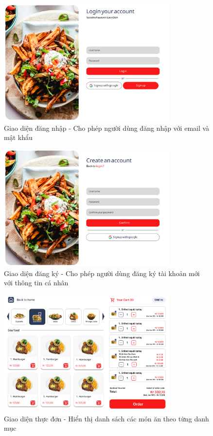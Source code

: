 \documentclass[a4paper]{article}
\begin{document}
    \begin{figure}[H]
        \centering
        \includegraphics[width=0.8\textwidth]{figmaLogin.png}
        \caption{Giao diện đăng nhập - Cho phép người dùng đăng nhập với email và mật khẩu}
    \end{figure}
    
    \begin{figure}[H]
        \centering
        \includegraphics[width=0.8\textwidth]{figmaRegister.png}
        \caption{Giao diện đăng ký - Cho phép người dùng đăng ký tài khoản mới với thông tin cá nhân}
    \end{figure}
    
    \begin{figure}[H]
        \centering
        \includegraphics[width=0.8\textwidth]{figmaMenu.png}
        \caption{Giao diện thực đơn - Hiển thị danh sách các món ăn theo từng danh mục}
    \end{figure}
    
\end{document}
